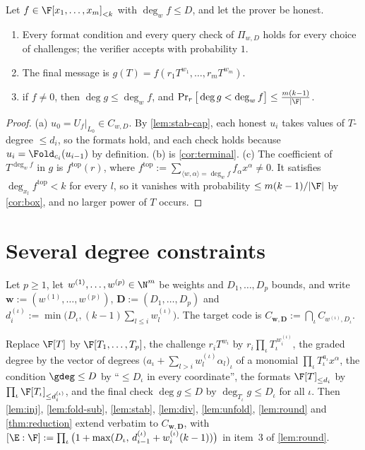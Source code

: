 {{{\renewcommand{\theproposition}{P1}
\begin{proposition}\label{prop:complete}
Let $f\in\F[x_1,\dots,x_m]_{<k}$ with $\deg_wf\le D$, and let the prover be honest.
\begin{enumerate}
\item[(a)] Every format condition and every query check of $\Pi_{w,D}$ holds for every
choice of challenges; the verifier accepts with probability $1$.
\item[(b)] The final message is $g(T)=f(r_1T^{w_1},\dots,r_mT^{w_m})$.
\item[(c)] if $f\ne0$, then $\deg g\le\deg_wf$, and
$\Pr_r\big[\deg g<\deg_wf\big]\le\frac{m(k-1)}{|\F|}$.
\end{enumerate}
\end{proposition}}

\begin{proof}
(a) $u_0=U_f|_{L_0}\in C_{w,D}$. By \ref{lem:stab-cap}, each honest $u_i$ takes values of
$T$-degree $\le d_i$, so the formats hold, and each check holds because
$u_i=\Fold_{c_i}(u_{i-1})$ by definition.
(b) is \ref{cor:terminal}.
(c) The coefficient of $T^{\deg_wf}$ in $g$ is $f^{\mathrm{top}}(r)$, where
$f^{\mathrm{top}}:=\sum_{\langle w,\alpha\rangle=\deg_wf}f_\alpha x^\alpha\ne0$. It satisfies
$\deg_{x_l}f^{\mathrm{top}}<k$ for every $l$, so it vanishes with probability $\le m(k-1)/|\F|$ by
\ref{cor:box}, and no larger power of $T$ occurs.
\end{proof}

\section{Several degree constraints}

Let $p\ge1$, let $w^{(1)},\dots,w^{(p)}\in\N^m$ be weights and $D_1,\dots,D_p$ bounds, and
write $\mathbf w:=(w^{(1)},\dots,w^{(p)})$, $\mathbf D:=(D_1,\dots,D_p)$ and $d^{(\iota)}_i:=\min\big(D_{\iota},(k-1)\sum_{l\le i}w^{(\iota)}_l\big)$. The target code is $C_{\mathbf w,\mathbf D}:=\bigcap_{\iota}C_{w^{(\iota)},D_{\iota}}$.

\begin{remark}\label{rem:multi}
Replace $\F[T]$ by $\F[T_1,\dots,T_p]$, the challenge $r_iT^{w_i}$ by
$r_i\prod_{\iota}T_{\iota}^{\,w^{(\iota)}_i}$, the graded degree by the vector of degrees
$\big(a_{\iota}+\sum_{l>i}w^{(\iota)}_l\alpha_l\big)_{\iota}$ of a monomial $\prod_{\iota}T_{\iota}^{a_{\iota}}x^\alpha$, the
condition $\gdeg\le D$ by ``$\le D_{\iota}$ in every coordinate'', the formats $\F[T]_{\le d_i}$ by
$\prod_{\iota}\F[T_{\iota}]_{\le d^{(\iota)}_i}$, and the final check $\deg g\le D$ by $\deg_{T_{\iota}}g\le D_{\iota}$
for all $\iota$. Then \ref{lem:inj}, \ref{lem:fold-sub}, \ref{lem:stab}, \ref{lem:div},
\ref{lem:unfold}, \ref{lem:round} and \ref{thm:reduction} extend verbatim to
$C_{\mathbf w,\mathbf D}$, with $[\E:\F]:=\prod_{\iota}\big(1+\max(D_{\iota},\,d^{(\iota)}_{i-1}+w^{(\iota)}_i(k-1))\big)$
in item~3 of \ref{lem:round}.



\end{remark}}}
